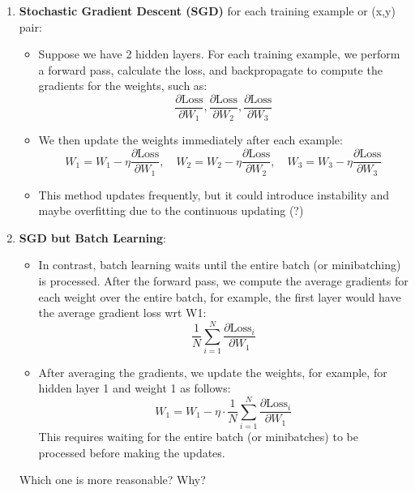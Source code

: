 \documentclass{letter}
\begin{document}
\begin{enumerate}
    \item \textbf{Stochastic Gradient Descent (SGD)} for each training example or (x,y) pair:
    \begin{itemize}
        \item Suppose we have 2 hidden layers. For each training example, we perform a forward pass, calculate the loss, and backpropagate to compute the gradients for the weights, such as:
        \[
        \frac{\partial \text{Loss}}{\partial W_1}, \frac{\partial \text{Loss}}{\partial W_2}, \frac{\partial \text{Loss}}{\partial W_3}
        \]
        \item We then update the weights immediately after each example:
        \[
        W_1 = W_1 - \eta \frac{\partial \text{Loss}}{\partial W_1}, \quad W_2 = W_2 - \eta \frac{\partial \text{Loss}}{\partial W_2}, \quad W_3 = W_3 - \eta \frac{\partial \text{Loss}}{\partial W_3}
        \]
        \item This method updates frequently, but it could introduce instability and maybe overfitting due to the continuous updating (?)
    \end{itemize}

    \item \textbf{SGD but Batch Learning}:
    \begin{itemize}
        \item In contrast, batch learning waits until the entire batch (or minibatching) is processed. After the forward pass, we compute the average gradients for each weight over the entire batch, for example, the first layer would have the average gradient loss wrt W1:
        \[
        \frac{1}{N} \sum_{i=1}^{N} \frac{\partial \text{Loss}_i}{\partial W_1}
        \]
        \item After averaging the gradients, we update the weights, for example, for hidden layer 1 and weight 1 as follows:
        \[
        W_1 = W_1 - \eta \cdot \frac{1}{N} \sum_{i=1}^{N} \frac{\partial \text{Loss}_i}{\partial W_1}
        \]
This requires waiting for the entire batch (or minibatches) to be processed before making the updates.
    \end{itemize}

Which one is more reasonable? Why?

\end{enumerate}
\end{document}
